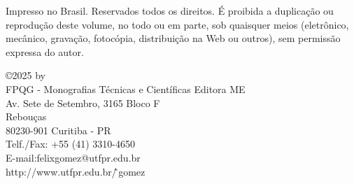 \vspace*{2.0cm}
\begin{center}
\end{center}

\vspace*{2.0cm}
\begin{minipage}{4.5in}
	\renewcommand{\baselinestretch}{1.0}
	\footnotesize
	Impresso no Brasil. Reservados todos os direitos. É proibida a duplicação ou reprodução deste 
	volume, no todo ou em parte, sob quaisquer meios (eletrônico, mecânico, gravação, fotocópia, 
	distribuição na Web ou outros), sem permissão expressa do autor.
\end{minipage}

\vspace*{2.0cm}
\begin{minipage}{4.5in}
	\renewcommand{\baselinestretch}{1.0}
	\small
	\copyright 2025 by\\
	FPQG - Monografias Técnicas e Científicas Editora ME\\
	Av. Sete de Setembro, 3165  Bloco F\\
	Rebouças \\
	80230-901 \;  Curitiba - PR\\
	Telf./Fax: +55 (41) 3310-4650\\
	E-mail:\;felixgomez@utfpr.edu.br\\
	http://www.utfpr.edu.br/\~\,gomez
\end{minipage}
